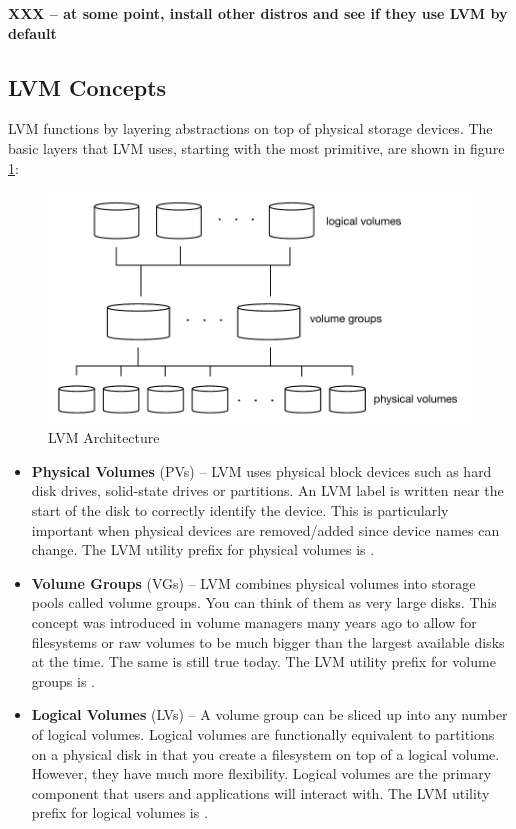 \noindent
\textbf{XXX -- at some point, install other distros and see if they use LVM by default}


\subsection{LVM Concepts}

LVM functions by layering abstractions on top of physical storage devices. The basic layers that LVM uses, starting with the most primitive, are shown in figure \ref{fig:LVM}:

\begin{figure}[h]
	\includegraphics[scale=0.6]{figures/LVM.pdf}
	\centering
	\caption{LVM Architecture}
	\label{fig:LVM}
\end{figure}

\begin{itemize}
	\item \textbf{Physical Volumes} (PVs) -- LVM uses physical block devices such as hard disk drives, solid-state drives or 
		partitions. An LVM label is written near the start of the disk to correctly identify the device. This is particularly important
		when physical devices are removed/added since device names can change. The LVM utility prefix for physical volumes
		is .
	\item \textbf{Volume Groups} (VGs) -- LVM combines physical volumes into storage pools called volume groups. You can
		think of them as very large disks. This concept was introduced in volume managers many years ago to allow for
		filesystems or raw volumes to be much bigger than the largest available disks at the time. The same is still true
		today. The LVM utility prefix for volume groups is . 
	\item \textbf{Logical Volumes} (LVs) --  A volume group can be sliced up into any number of logical volumes. Logical volumes 
		are functionally equivalent to partitions on a physical disk in that you create a filesystem on top of a logical volume.
		However, they have much more flexibility. Logical volumes are the primary component that users and applications 
		will interact with. The LVM utility prefix for logical volumes is . 
\end{itemize}


